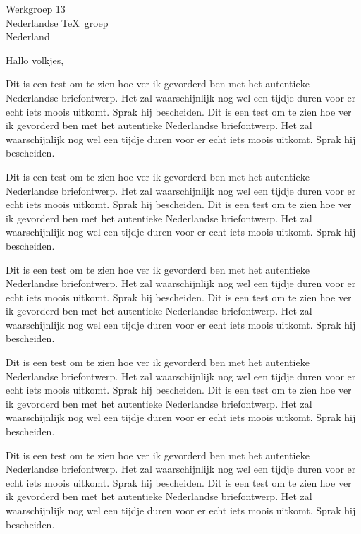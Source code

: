 \documentclass{brief}      %
\begin{document}
 
\begin{brief}{Werkgroep 13\\Nederlandse \TeX\ groep\\Nederland}
 
\opening{Hallo volkjes,}
 
Dit is een test om te zien hoe ver ik gevorderd ben met het
autentieke Nederlandse briefontwerp.
Het zal waarschijnlijk nog wel een tijdje duren voor er
echt iets moois uitkomt. Sprak hij bescheiden.
Dit is een test om te zien hoe ver ik gevorderd ben met het
autentieke Nederlandse briefontwerp.
Het zal waarschijnlijk nog wel een tijdje duren voor er
echt iets moois uitkomt. Sprak hij bescheiden.
 
 
 
Dit is een test om te zien hoe ver ik gevorderd ben met het
autentieke Nederlandse briefontwerp.
Het zal waarschijnlijk nog wel een tijdje duren voor er
echt iets moois uitkomt. Sprak hij bescheiden.
Dit is een test om te zien hoe ver ik gevorderd ben met het
autentieke Nederlandse briefontwerp.
Het zal waarschijnlijk nog wel een tijdje duren voor er
echt iets moois uitkomt. Sprak hij bescheiden.
 
Dit is een test om te zien hoe ver ik gevorderd ben met het
autentieke Nederlandse briefontwerp.
Het zal waarschijnlijk nog wel een tijdje duren voor er
echt iets moois uitkomt. Sprak hij bescheiden.
Dit is een test om te zien hoe ver ik gevorderd ben met het
autentieke Nederlandse briefontwerp.
Het zal waarschijnlijk nog wel een tijdje duren voor er
echt iets moois uitkomt. Sprak hij bescheiden.
 
Dit is een test om te zien hoe ver ik gevorderd ben met het
autentieke Nederlandse briefontwerp.
Het zal waarschijnlijk nog wel een tijdje duren voor er
echt iets moois uitkomt. Sprak hij bescheiden.
Dit is een test om te zien hoe ver ik gevorderd ben met het
autentieke Nederlandse briefontwerp.
Het zal waarschijnlijk nog wel een tijdje duren voor er
echt iets moois uitkomt. Sprak hij bescheiden.
 
Dit is een test om te zien hoe ver ik gevorderd ben met het
autentieke Nederlandse briefontwerp.
Het zal waarschijnlijk nog wel een tijdje duren voor er
echt iets moois uitkomt. Sprak hij bescheiden.
Dit is een test om te zien hoe ver ik gevorderd ben met het
autentieke Nederlandse briefontwerp.
Het zal waarschijnlijk nog wel een tijdje duren voor er
echt iets moois uitkomt. Sprak hij bescheiden.
 

\end{brief}
\end{document}
